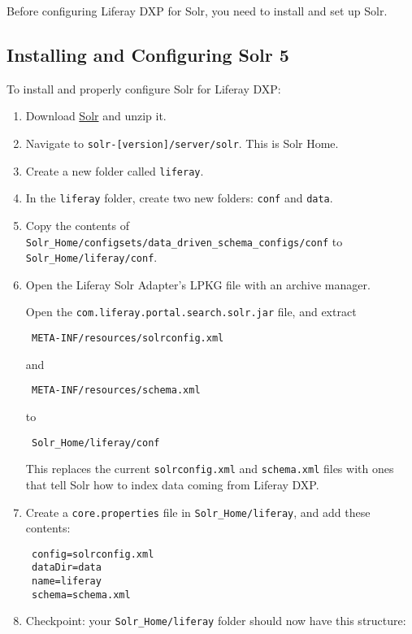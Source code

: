 Before configuring Liferay DXP for Solr, you need to install and set up
Solr.

\subsection{Installing and Configuring Solr
5}\label{installing-and-configuring-solr-5}

To install and properly configure Solr for Liferay DXP:

\begin{enumerate}
\def\labelenumi{\arabic{enumi}.}
\item
  Download
  \href{http://archive.apache.org/dist/lucene/solr/5.2.1/solr-5.2.1.zip}{Solr}
  and unzip it.
\item
  Navigate to \texttt{solr-{[}version{]}/server/solr}. This is Solr
  Home.
\item
  Create a new folder called \texttt{liferay}.
\item
  In the \texttt{liferay} folder, create two new folders: \texttt{conf}
  and \texttt{data}.
\item
  Copy the contents of
  \texttt{Solr\_Home/configsets/data\_driven\_schema\_configs/conf} to
  \texttt{Solr\_Home/liferay/conf}.
\item
  Open the Liferay Solr Adapter's LPKG file with an archive manager.

  Open the \texttt{com.liferay.portal.search.solr.jar} file, and extract

\begin{verbatim}
 META-INF/resources/solrconfig.xml
\end{verbatim}

  and

\begin{verbatim}
 META-INF/resources/schema.xml
\end{verbatim}

  to

\begin{verbatim}
 Solr_Home/liferay/conf
\end{verbatim}

  This replaces the current \texttt{solrconfig.xml} and
  \texttt{schema.xml} files with ones that tell Solr how to index data
  coming from Liferay DXP.
\item
  Create a \texttt{core.properties} file in \texttt{Solr\_Home/liferay},
  and add these contents:

\begin{verbatim}
 config=solrconfig.xml
 dataDir=data
 name=liferay
 schema=schema.xml
\end{verbatim}
\item
  Checkpoint: your \texttt{Solr\_Home/liferay} folder should now have
  this structure:


\end{enumerate}
